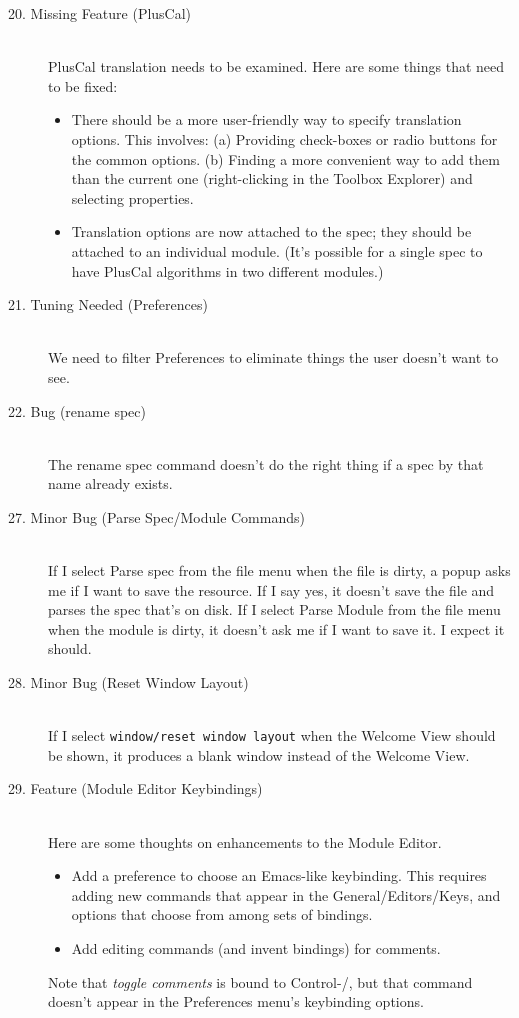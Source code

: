 \documentclass{article}
\begin{document}
\begin{description}
\item[20. Missing Feature (PlusCal)] \mbox{}\\
%
PlusCal translation needs to be examined.  Here are some things that
need to be fixed:
\begin{itemize}
\item There should be a more user-friendly way to specify translation
   options.  This involves:
   (a) Providing check-boxes or radio buttons for the common options.
   (b) Finding a more convenient way to add them than the current
       one (right-clicking in the Toolbox Explorer) and selecting
       properties.
\item Translation options are now attached to the spec; they should
   be attached to an individual module.  (It's possible for a
   single spec to have PlusCal algorithms in two different 
   modules.)

\end{itemize}
   

\item[21. Tuning Needed (Preferences)] \mbox{}\\
%
We need to filter Preferences to eliminate things the user doesn't want
to see.

\item[22. Bug  (rename spec)] \mbox{}\\
%
The rename spec command doesn't do the right thing if a spec by that
name already exists.
      
\item[27. Minor Bug  (Parse Spec/Module Commands)] \mbox{}\\
%
If I select Parse spec from the file menu when the file is dirty, a
popup asks me if I want to save the resource.  If I say yes, it
doesn't save the file and parses the spec that's on disk.  If I select
Parse Module from the file menu when the module is dirty, it doesn't
ask me if I want to save it.  I expect it should.
 
\item[28. Minor Bug  (Reset Window Layout)] \mbox{}\\
%
If I select {\tt window/reset window layout} when the Welcome View
should be shown, it produces a blank window instead of the Welcome
View.

\item[29. Feature (Module Editor Keybindings)] \mbox{}\\
%
Here are some thoughts on enhancements to the Module Editor.  
\begin{itemize}
\item Add a
preference to choose an Emacs-like keybinding.  This requires
  adding new commands that appear in the General/Editors/Keys, and
  options that choose from among sets of bindings.
\item Add editing commands (and invent bindings) for comments.  
\end{itemize}
Note that \emph{toggle comments} is bound to Control-/, but that command
doesn't appear in the Preferences menu's keybinding options.


\end{description}
\end{document}
